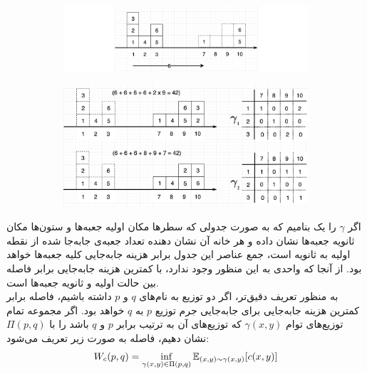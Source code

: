 \begin{figure}[h]
	\centering
	\begin{subfigure}[t]{.7\textwidth}
		\centering
		\includegraphics[width=1.\textwidth]{images/wasser2.png}
		\caption{}
		\label{fig:chap2:wasser1}
	\end{subfigure}

	\begin{subfigure}[t]{.6\textwidth}
		\centering
		\includegraphics[width=1.\textwidth]{images/wasser1.jpeg}
		\caption{}
		\label{fig:chap2:wasser2}
	\end{subfigure}
\end{figure}
اگر $\gamma$ را یک
بنامیم که به صورت جدولی که سطرها مکان اولیه جعبه‌ها و ستون‌ها مکان ثانویه جعبه‌ها نشان داده و هر خانه آن نشان دهنده تعداد جعبه‌ی جابه‌جا شده از نقطه اولیه به ثانویه است، جمع عناصر این جدول برابر هزینه جابه‌جایی کلیه جعبه‌ها خواهد بود. از آنجا که \transportplan{} واحدی به این منظور وجود ندارد، \transportplan{} با کمترین هزینه جابه‌جایی برابر فاصله \wasser{} بین حالت اولیه و ثانویه جعبه‌ها است.
\\
به منظور تعریف دقیق‌تر، اگر دو توزیع به نام‌های $q$ و $p$ داشته باشیم، فاصله \wasser{} برابر کمترین هزینه جابه‌جایی برای جابه‌جایی جرم توزیع $p$ به $q$ خواهد بود.
اگر مجموعه تمام توزیع‌های توام $\gamma(x,y)$ که توزیع‌های \marginal{} آن به ترتیب برابر $p$ و $q$ باشد را با $\Pi(p,q)$ نشان دهیم، فاصله \wasser{} به صورت زیر تعریف می‌شود:
\begin{align}
	W_c(p,q) = \inf_{\gamma(x,y) \in \Pi(p,q)} \mathbb E_{(x,y) \sim \gamma(x,y)} [ c(x,y) ]
\end{align}
